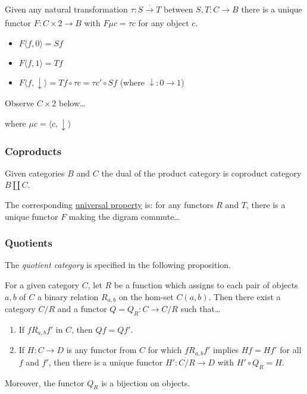 \label{universalnaturaltransformation}

Given any natural transformation $\tau: S \xrightarrow[]{\cdot} T$ between $S,T: C \rightarrow B$ there is a unique functor $F: C \times 2 \rightarrow B$ with $F \mu c = \tau c$ for any object $c$.
\begin{itemize}
  \item $F\langle f,0 \rangle = Sf$
  \item $F\langle f,1 \rangle = Tf$
  \item $F\langle f, \downarrow \rangle = Tf \circ \tau c = \tau c' \circ Sf$ (where $\downarrow : 0 \rightarrow 1$)
\end{itemize}

\noindent Observe $C \times 2$ below\dots

\begin{figure}[H]
\centering

\end{figure}

\noindent where $\mu c = \langle c, \downarrow \rangle$

\subsubsection{Coproducts}\label{products}

Given categories $B$ and $C$ the dual of the product category is coproduct category $B \coprod C$.\newline

\noindent The corresponding \hyperref[universality]{universal property} is: for any functors $R$ and $T$, there is a unique functor $F$ making the digram commute\dots
\begin{figure}[H]
\centering

\end{figure}

\subsubsection{Quotients}\label{quotients}

The \emph{quotient category} is specified in the following proposition.

\begin{proposition}
For a given category $C$, let $R$ be a function which assigns to each pair of objects $a,b$ of $C$ a binary relation $R_{a,b}$ on the hom-set $C(a,b)$.
Then there exist a category $C/R$ and a functor $Q = Q_R:C \rightarrow C/R$ such that\dots
\begin{enumerate}
  \item If $fR_{a,b}f'$ in $C$, then $Qf = Qf'$.
  \item If $H:C \rightarrow D$ is any functor from $C$ for which $f R_{a,b} f'$ implies $Hf = Hf'$ for all $f$ and $f'$, then there is a unique functor $H':C/R \rightarrow D$
  with $H' \circ Q_R = H$.
\end{enumerate}
Moreover, the functor $Q_R$ is a bijection on objects.
\end{proposition}

